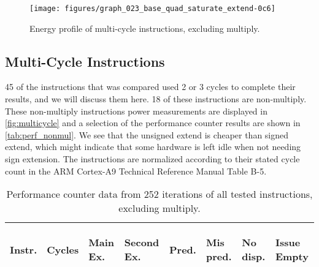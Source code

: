 \begin{figure}
    \centering
    \texttt{[image: figures/graph\_023\_base\_quad\_saturate\_extend-0c6]}
    \caption{Energy profile of multi-cycle instructions, excluding multiply.}
    \label{fig:multicycle}
\end{figure}


\subsection{Multi-Cycle Instructions}


45 of the instructions that was compared used 2 or 3 cycles to complete their
results, and we will discuss them here. 18 of these instructions are
non-multiply.  These non-multiply instructions power measurements are displayed
in \autoref{fig:multicycle} and a selection of the performance counter results
are shown in \autoref{tab:perf_nonmul}. We see that the unsigned extend is
cheaper than signed extend, which might indicate that some hardware is left idle
when not needing sign extension. The instructions are normalized according to
their stated cycle count in the ARM Cortex-A9 Technical Reference Manual Table
B-5\cite{armtech}.

\begin{table}
    \centering
    \begin{tabular}{|p{0.7cm}|R{0.8cm}R{0.6cm}R{0.85cm}R{0.6cm}R{0.45cm}R{0.75cm}R{0.72cm}|}
        \hline
        \centering
        Instr. &
        \centering
        Cycles &
        \centering
        Main Ex. &
        \centering
        Second Ex. &
        \centering
        Pred.&
        \centering
        Mis pred.&
        \centering
        No disp. &
        \begin{centering}
        Issue Empty
        \end{centering}
        \\
        \hline
        
        \hline
    \end{tabular}
    \caption{Performance counter data from 252 iterations of all tested
    instructions, excluding multiply.}
    \label{tab:perf_nonmul}
    \hfill
\end{table}

